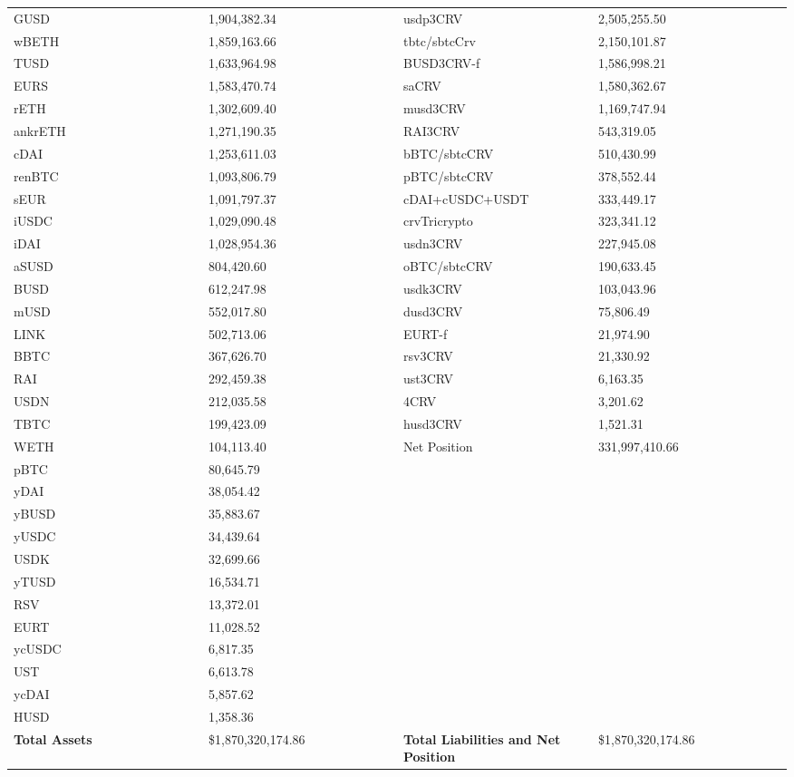\begin{longtable}{@{}p{0.25\linewidth}p{0.25\linewidth}p{0.25\linewidth}p{0.25\linewidth}@{}}
GUSD & 1,904,382.34 & usdp3CRV &2,505,255.50 \\
wBETH & 1,859,163.66 & tbtc/sbtcCrv &2,150,101.87 \\
TUSD & 1,633,964.98 & BUSD3CRV-f &1,586,998.21 \\
EURS & 1,583,470.74 & saCRV &1,580,362.67 \\
rETH & 1,302,609.40 & musd3CRV &1,169,747.94 \\
ankrETH & 1,271,190.35 & RAI3CRV &543,319.05 \\
cDAI & 1,253,611.03 & bBTC/sbtcCRV &510,430.99 \\
renBTC & 1,093,806.79 & pBTC/sbtcCRV &378,552.44 \\
sEUR & 1,091,797.37 & cDAI+cUSDC+USDT &333,449.17 \\
iUSDC & 1,029,090.48 & crvTricrypto &323,341.12 \\
iDAI & 1,028,954.36 & usdn3CRV &227,945.08 \\
aSUSD & 804,420.60 & oBTC/sbtcCRV &190,633.45 \\
BUSD & 612,247.98 & usdk3CRV &103,043.96 \\
mUSD & 552,017.80 & dusd3CRV &75,806.49 \\
LINK & 502,713.06 & EURT-f &21,974.90 \\
BBTC & 367,626.70 & rsv3CRV &21,330.92 \\
RAI & 292,459.38 & ust3CRV &6,163.35 \\
USDN & 212,035.58 & 4CRV &3,201.62 \\
TBTC & 199,423.09 & husd3CRV &1,521.31 \\
WETH & 104,113.40 & Net Position &331,997,410.66 \\
pBTC & 80,645.79 & & \\
yDAI & 38,054.42 & & \\
yBUSD & 35,883.67 & & \\
yUSDC & 34,439.64 & & \\
USDK & 32,699.66 & & \\
yTUSD & 16,534.71 & & \\
RSV & 13,372.01 & & \\
EURT & 11,028.52 & & \\
ycUSDC & 6,817.35 & & \\
UST & 6,613.78 & & \\
ycDAI & 5,857.62 & & \\
HUSD & 1,358.36 & & \\

\midrule

\textbf{Total Assets} & \$1,870,320,174.86 & \textbf{Total Liabilities and Net Position} & \$1,870,320,174.86 \\

\bottomrule

\end{longtable}
